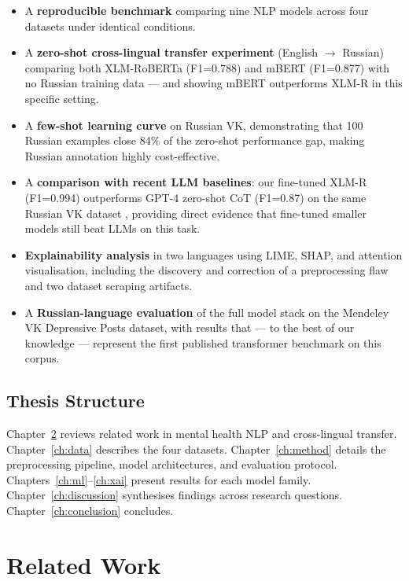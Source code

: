 \documentclass[12pt, a4paper, oneside]{report}
\begin{document}
\begin{itemize}
    \item A \textbf{reproducible benchmark} comparing nine NLP models across four datasets under identical conditions.
    \item A \textbf{zero-shot cross-lingual transfer experiment} (English $\rightarrow$ Russian) comparing both XLM-RoBERTa (F1=0.788) and mBERT (F1=0.877) with no Russian training data — and showing mBERT outperforms XLM-R in this specific setting.
    \item A \textbf{few-shot learning curve} on Russian VK, demonstrating that 100 Russian examples close 84\% of the zero-shot performance gap, making Russian annotation highly cost-effective.
    \item A \textbf{comparison with recent LLM baselines}: our fine-tuned XLM-R (F1=0.994) outperforms GPT-4 zero-shot CoT (F1=0.87) on the same Russian VK dataset \citep{raihan2025}, providing direct evidence that fine-tuned smaller models still beat LLMs on this task.
    \item \textbf{Explainability analysis} in two languages using LIME, SHAP, and attention visualisation, including the discovery and correction of a preprocessing flaw and two dataset scraping artifacts.
    \item A \textbf{Russian-language evaluation} of the full model stack on the Mendeley VK Depressive Posts dataset, with results that — to the best of our knowledge — represent the first published transformer benchmark on this corpus.
\end{itemize}

\section{Thesis Structure}

Chapter~\ref{ch:related} reviews related work in mental health NLP and cross-lingual transfer. Chapter~\ref{ch:data} describes the four datasets. Chapter~\ref{ch:method} details the preprocessing pipeline, model architectures, and evaluation protocol. Chapters~\ref{ch:ml}--\ref{ch:xai} present results for each model family. Chapter~\ref{ch:discussion} synthesises findings across research questions. Chapter~\ref{ch:conclusion} concludes.

\chapter{Related Work}
\label{ch:related}
\end{document}
